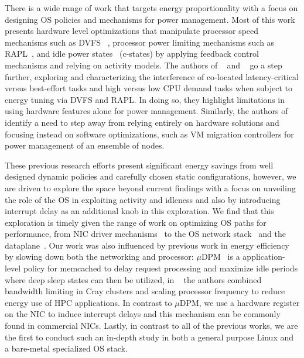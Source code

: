 There is a wide range of work that targets energy proportionality with a focus on designing OS policies and mechanisms for power management. Most of this work presents hardware level optimizations that manipulate processor speed mechanisms such as DVFS ~\cite{10.5555/2523721.2523732,10.1145/381677.381702,cpufreq_governor,4273098,packandcap,10.1109/MICRO.2006.8,1598114,10.1145/1629911.1629926,4658633,4343825,10.1109/IGCC.2011.6008552,10.1145/1241601.1241609, slowdownorsleep,4228267, mootaz}, processor power limiting mechanisms such as RAPL~\cite{intel_rapl, heracles, SmoothOperator,oldi-pegasus, Dynamo,PerAppPower,powercap}, and idle power states~\cite{cpuidle_policy,peafowl, udpm,6983037,dreamweaver, pacingtoidle} (c-states) by applying feedback control mechanisms and relying on activity models. The authors of ~\cite{heracles} and ~\cite{PerAppPower} go a step further, exploring and characterizing the interference of co-located latency-critical versus best-effort tasks and high versus low CPU demand tasks when subject to energy tuning via DVFS and RAPL. In doing so, they highlight limitations in using hardware features alone for power management. Similarly, the authors of ~\cite{hotpower2008, 7349225} identify a need to step away from relying entirely on hardware solutions and focusing instead on software optimizations, such as VM migration controllers for power management of an ensemble of nodes.

These previous research efforts present significant energy savings from well designed dynamic policies and carefully chosen static configurations, however, we are driven to explore the space beyond current findings with a focus on unveiling the role of the OS in exploiting activity and idleness and also by introducing interrupt delay as an additional knob in this exploration. We find that this exploration is timely given the range of work on optimizing OS paths for performance, from NIC driver mechanisms~\cite{flexnic, affinityaccept, network-latency} to the OS network stack~\cite{mtcp, sandstorm, network-latency} and the dataplane~\cite{222583, 10.1145/2812806, EbbRT, shenango, zygos, ix}. Our work was also influenced by previous work in energy efficiency by slowing down both the networking and processor: $\mu$DPM~\cite{udpm} is a application-level policy for memcached to delay request processing and maximize idle periods where deep sleep states can then be utilized, in ~\cite{10.5555/2338816.2338822} the authors combined bandwidth limiting in Cray clusters and scaling processor frequency to reduce energy use of HPC applications. In contrast to $\mu$DPM, we use a hardware register on the NIC to induce interrupt delays and this mechanism can be commonly found in commercial NICs. Lastly, in contrast to all of the previous works, we are the first to conduct such an in-depth study in both a general purpose Linux and a bare-metal specialized OS stack.

